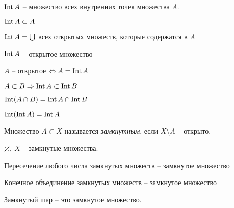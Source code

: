     \begin{notation}
        $\operatorname{Int} A$ -- множество всех внутренних точек множества $A$. 
    \end{notation}

    \begin{Thm}[Свойства]
        \begin{MyList}
            \item $\operatorname{Int} A \subset A$
            \item $\operatorname{Int} A = \bigcup$ всех открытых множеств, которые содержатся в $A$
            \item $\operatorname{Int} A$ -- открытое множество
            \item $A$ -- открытое $\Leftrightarrow A = \operatorname{Int} A$
            \item $A \subset B \Rightarrow \operatorname{Int} A \subset \operatorname{Int} B$
            \item $\operatorname{Int} (A \cap B) = \operatorname{Int} A \cap \operatorname{Int} B$
            \item $\operatorname{Int} (\operatorname{Int} A) = \operatorname{Int} A$   
        \end{MyList}
    \end{Thm}

    \begin{Def}
        Множество $A \subset X$ называется \textit{замкнутным}, если $X \setminus A$ -- открыто.
    \end{Def}

    \begin{Thm}
        \begin{MyList}
            \item $\varnothing, \ X$ -- замкнутые множества.
            \item Пересечение любого числа замкнутых множеств -- замкнутое множество
            \item Конечное объединение замкнутых множеств -- замкнутое множество
            \item Замкнутый шар -- это замкнутое множество.
        \end{MyList}
    \end{Thm}

